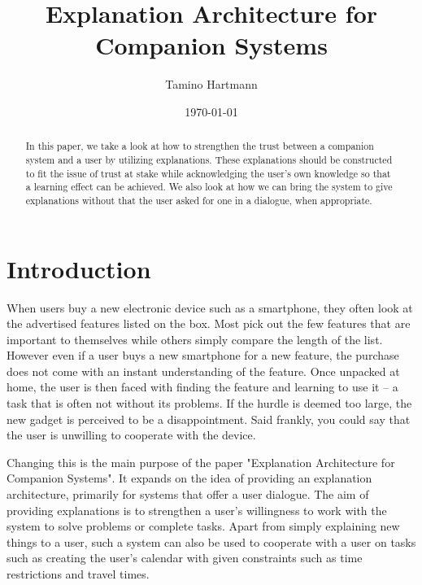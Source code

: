 \documentclass[a4paper]{article}
\begin{document}
\title{Explanation Architecture for Companion Systems}
\author{Tamino Hartmann}
\date{\today}

\maketitle

\begin{abstract}
In this paper, we take a look at how to strengthen the trust between a companion system and a user by utilizing explanations. These explanations should be constructed to fit the issue of trust at stake while acknowledging the user's own knowledge so that a learning effect can be achieved. We also look at how we can bring the system to give explanations without that the user asked for one in a dialogue, when appropriate.
\end{abstract}

\large

\section{Introduction}

When users buy a new electronic device such as a smartphone, they often look at the advertised features listed on the box. Most pick out the few features that are important to themselves while others simply compare the length of the list. However even if a user buys a new smartphone for a new feature, the purchase does not come with an instant understanding of the feature. Once unpacked at home, the user is then faced with finding the feature and learning to use it – a task that is often not without its problems. If the hurdle is deemed too large, the new gadget is perceived to be a disappointment. Said frankly, you could say that the user is unwilling to cooperate with the device.

Changing this is the main purpose of the paper "Explanation Architecture for Companion Systems"\cite{origin}. It expands on the idea of providing an explanation architecture, primarily for systems that offer a user dialogue. The aim of providing explanations is to strengthen a user's willingness to work with the system to solve problems or complete tasks. Apart from simply explaining new things to a user, such a system can also be used to cooperate with a user on tasks such as creating the user's calendar with given constraints such as time restrictions and travel times.
\end{document}
